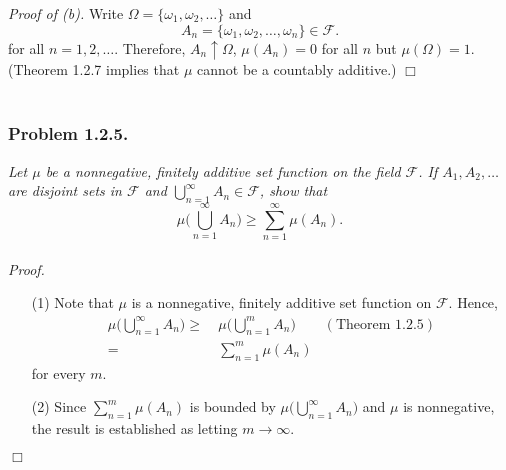 \documentclass{article}
\begin{document}
\emph{Proof of (b).}
  Write $\Omega = \{ \omega_1, \omega_2, \ldots \}$ and
  \[
    A_n = \{ \omega_1, \omega_2, \ldots, \omega_n \} \in \mathscr{F}.
  \]
  for all $n = 1, 2, \ldots$.
  Therefore, $A_n \uparrow \Omega$, $\mu(A_n) = 0$ for all $n$ but $\mu(\Omega) = 1$.
  (Theorem 1.2.7 implies that $\mu$ cannot be a countably additive.)
$\Box$ \\\\






\subsubsection*{Problem 1.2.5.}
\emph{Let $\mu$ be a nonnegative,
finitely additive set function on the field $\mathscr{F}$.
If $A_1, A_2, \ldots$ are disjoint sets in $\mathscr{F}$
and $\bigcup_{n=1}^{\infty} A_n \in \mathscr{F}$, show that}
\[
  \mu \Bigg( \bigcup_{n=1}^{\infty} A_n \Bigg)
  \geq
  \sum_{n=1}^{\infty} \mu(A_n).
\] \\



\emph{Proof.}
\begin{enumerate}
\item[(1)]
  Note that $\mu$ is a nonnegative, finitely additive set function on $\mathscr{F}$.
  Hence,
  \begin{align*}
    \mu \Bigg( \bigcup_{n=1}^{\infty} A_n \Bigg)
    \geq
    & \:
      \mu \Bigg( \bigcup_{n=1}^{m} A_n \Bigg)
      & (\text{Theorem 1.2.5}) \\
    =
    & \:
      \sum_{n=1}^{m} \mu(A_n)
  \end{align*}
  for every $m$.

\item[(2)]
  Since $\sum_{n=1}^{m} \mu(A_n)$ is bounded by $\mu \big( \bigcup_{n=1}^{\infty} A_n \big)$
  and $\mu$ is nonnegative,
  the result is established as letting $m \to \infty$.
\end{enumerate}
$\Box$ \\\\



\end{document}
